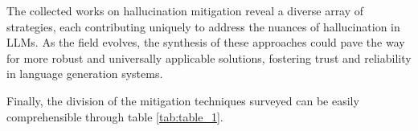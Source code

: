 \documentclass[11pt]{article}
\begin{document}
The collected works on hallucination mitigation reveal a diverse array of strategies, each contributing uniquely to address the nuances of hallucination in LLMs. As the field evolves, the synthesis of these approaches could pave the way for more robust and universally applicable solutions, fostering trust and reliability in language generation systems.

Finally, the division of the mitigation techniques surveyed can be easily comprehensible through table \ref{tab:table_1}. 





\appendix


    
\end{document}
